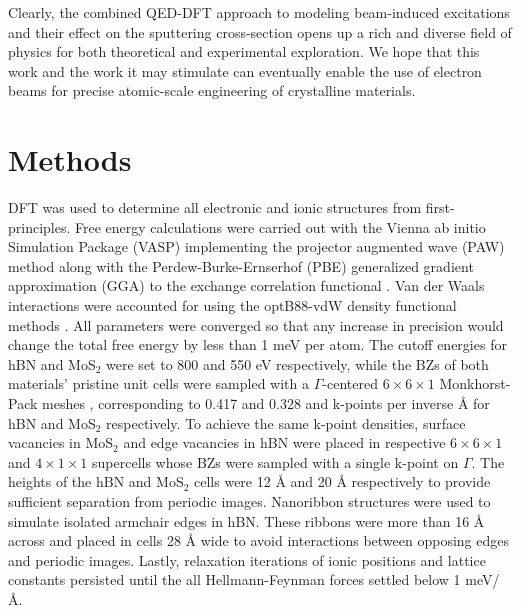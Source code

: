 \documentclass{article}
\begin{document}
Clearly, the combined QED-DFT approach to modeling beam-induced excitations and
their effect on the sputtering cross-section opens up a rich and diverse field
of physics for both theoretical and experimental exploration.
We hope that this work and the work it may stimulate can eventually enable the
use of electron beams for precise atomic-scale engineering of crystalline
materials.

\section{Methods}
\label{sec:methods}

DFT \cite{Hohenberg1964, Kohn1965} was used to determine all electronic and
ionic structures from first-principles.
Free energy calculations were carried out with the Vienna ab initio Simulation
Package (VASP) \cite{Kresse1996, Kresse1996a} implementing the projector
augmented wave (PAW) method \cite{Blochl1994} along with the
Perdew-Burke-Ernserhof (PBE) generalized gradient approximation (GGA) to the
exchange correlation functional \cite{Perdew1996}.
Van der Waals interactions were accounted for using the optB88-vdW density
functional methods \cite{Klimes2010, Klimes2011}.
All parameters were converged so that any increase in precision would change
the total free energy by less than 1 meV per atom.
The cutoff energies for hBN and MoS$_2$ were set to 800 and 550 eV
respectively, while the BZs of both materials' pristine unit cells were sampled
with a $\Gamma$-centered $6\times6\times1$ Monkhorst-Pack meshes
\cite{Monkhorst1976}, corresponding to 0.417 and 0.328 and k-points per inverse
{\AA} for hBN and MoS$_2$ respectively.
To achieve the same k-point densities, surface vacancies in MoS$_2$ and edge
vacancies in hBN were placed in respective $6\times6\times1$ and
$4\times1\times1$ supercells whose BZs were sampled with a single k-point on
$\Gamma$.
The heights of the hBN and MoS$_2$ cells were 12 {\AA} and 20 {\AA}
respectively to provide sufficient separation from periodic images.
Nanoribbon structures were used to simulate isolated armchair edges in hBN.
These ribbons were more than 16 {\AA} across and placed in cells 28 {\AA} wide
to avoid interactions between opposing edges and periodic images.
Lastly, relaxation iterations of ionic positions and lattice constants
persisted until the all Hellmann-Feynman forces settled below 1 
meV/{\AA}.
\end{document}
